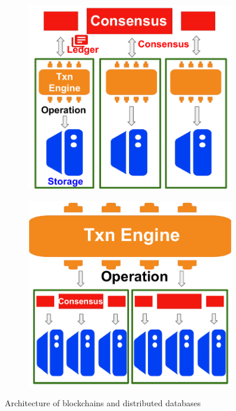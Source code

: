 \begin{figure}
    \centering
	\begin{subfigure}{0.45\textwidth}
	    \includegraphics[width=0.99\textwidth]{diagram/twin/bc_arch.pdf}
	    \caption{}
	\end{subfigure}%
	\begin{subfigure}{0.45\textwidth}
	    \includegraphics[width=0.99\textwidth]{diagram/twin/db_arch.pdf}
	    \caption{}
    \end{subfigure}%
    \caption{Architecture of blockchains and distributed databases}
    \label{diagram:twin:arch} 
\end{figure}

